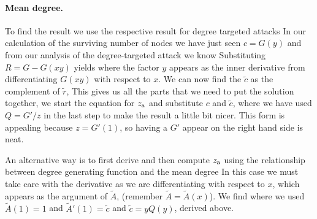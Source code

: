 \paragraph{Mean degree.} To find the result we use the respective result for degree targeted attacks 
In our calculation of the surviving number of nodes we have just seen $c=G(y)$ and from our analysis of the degree-targeted attack we know
Substituting $R=G-G(xy)$ yields
where the factor $y$ appears as the inner derivative from differentiating $G(xy)$ with respect to $x$. We can now find the $\tilde{c}$ as the complement of $\tilde{r}$,
This gives us all the parts that we need to put the solution together, we start the equation for $z_{\rm a}$ and substitute $c$ and $\tilde{c}$, 
where we have used $Q=G'/z$ in the last step to make the result a little bit nicer. This form is appealing because $z=G'(1)$, so having a $G'$ appear on the right hand side is neat. 

An alternative way is to first derive
and then compute $z_{\rm a}$ using the relationship between degree generating function and the mean degree 
In this case we must take care with the derivative as we are differentiating with respect to $x$, which appears as the argument of $\tilde{A}$, (remember $\tilde{A}=\tilde{A}(x)$). We find
where we used $\tilde{A}(1)=1$ and $\tilde{A}'(1)=\tilde{c}$ and $\tilde{c}=yQ(y)$, derived above.

